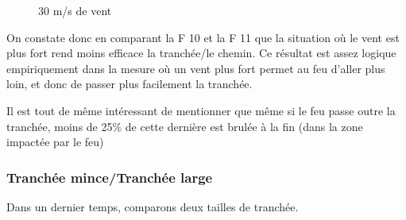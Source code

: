 \documentclass[12pt]{article}
\newcommand{\fig}[1]{
    F\resizebox{!}{1.3ex}{IGURE} #1
}
\begin{document}
\begin{figure}[!h]
\begin{minipage}{0.35\textwidth}
      \caption{$30$ m/s de vent}\label{Fig:Data8}
    \end{minipage}
\end{figure}

On constate donc en comparant la\fig{10}et la\fig{11}que la situation où le vent est plus fort rend moins efficace la tranchée/le chemin. Ce résultat est assez logique empiriquement dans la mesure où un vent plus fort permet au feu d'aller plus loin, et donc de passer plus facilement la tranchée.

Il est tout de même intéressant de mentionner que même si le feu passe outre la tranchée, moins de 25\% de cette dernière est brulée à la fin (dans la zone impactée par le feu)

\subsubsection{Tranchée mince/Tranchée large}

Dans un dernier temps, comparons deux tailles de tranchée.
\end{document}
